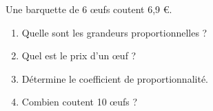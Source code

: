 
Une barquette de 6 œufs coutent 6,9 €.
\begin{enumerate}
\item Quelle sont les grandeurs proportionnelles ?
\item Quel est le prix d'un œuf ?
\item Détermine le coefficient de proportionnalité.
\item Combien coutent 10 œufs ?
\end{enumerate}
